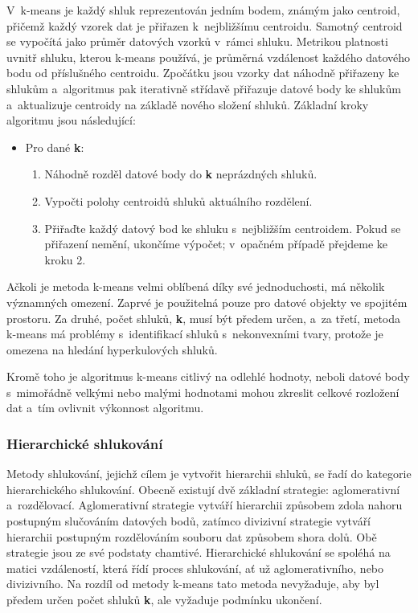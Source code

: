 V~k-means je každý shluk reprezentován jedním bodem, známým jako centroid, přičemž každý vzorek dat je přiřazen k~nejbližšímu centroidu. Samotný centroid se vypočítá jako průměr datových vzorků v~rámci shluku. Metrikou platnosti uvnitř shluku, kterou k-means používá, je průměrná vzdálenost každého datového bodu od příslušného centroidu. Zpočátku jsou vzorky dat náhodně přiřazeny ke shlukům a~algoritmus pak iterativně střídavě přiřazuje datové body ke shlukům a~aktualizuje centroidy na základě nového složení shluků. Základní kroky algoritmu jsou následující:
\begin{itemize}
	\item Pro dané \textbf{k}:
	\begin{enumerate}
		\item Náhodně rozděl datové body do \textbf{k} neprázdných shluků. 
		\item Vypočti polohy centroidů shluků aktuálního rozdělení.
		\item Přiřaďte každý datový bod ke shluku s~nejbližším centroidem. Pokud se přiřazení nemění, ukončíme výpočet; v~opačném případě přejdeme ke kroku 2.
	\end{enumerate}
\end{itemize}

Ačkoli je metoda k-means velmi oblíbená díky své jednoduchosti, má několik významných omezení. Zaprvé je použitelná pouze pro datové objekty ve spojitém prostoru. Za druhé, počet shluků, \textbf{k}, musí být předem určen, a~za třetí, metoda k-means má problémy s~identifikací shluků s~nekonvexními tvary, protože je omezena na hledání hyperkulových shluků.

\newpage

Kromě toho je algoritmus k-means citlivý na odlehlé hodnoty, neboli datové body s~mimořádně velkými nebo malými hodnotami mohou zkreslit celkové rozložení dat a~tím ovlivnit výkonnost algoritmu.

\subsubsection{Hierarchické shlukování}
Metody shlukování, jejichž cílem je vytvořit hierarchii shluků, se řadí do kategorie hierarchického shlukování\cite{Kaufman1990}. Obecně existují dvě základní strategie: aglomerativní a~rozdělovací. Aglomerativní strategie vytváří hierarchii způsobem zdola nahoru postupným slučováním datových bodů, zatímco divizivní strategie vytváří hierarchii postupným rozdělováním souboru dat způsobem shora dolů. Obě strategie jsou ze své podstaty chamtivé. Hierarchické shlukování se spoléhá na matici vzdáleností, která řídí proces shlukování, ať už aglomerativního, nebo divizivního. Na rozdíl od metody k-means tato metoda nevyžaduje, aby byl předem určen počet shluků \textbf{k}, ale vyžaduje podmínku ukončení.

